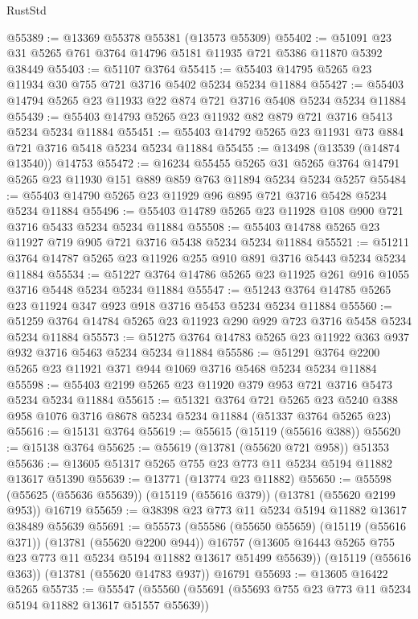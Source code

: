 \begin{lexlean}{RustStd}
\begin{coremodule}
@55389 := @13369 @55378 @55381 (@13573 @55309)
@55402 := @51091 @23 @31 @5265 @761 @3764 @14796 @5181 @11935 @721 @5386 @11870 @5392 @38449
@55403 := @51107 @3764
@55415 := @55403 @14795 @5265 @23 @11934 @30 @755 @721 @3716 @5402 @5234 @5234 @11884
@55427 := @55403 @14794 @5265 @23 @11933 @22 @874 @721 @3716 @5408 @5234 @5234 @11884
@55439 := @55403 @14793 @5265 @23 @11932 @82 @879 @721 @3716 @5413 @5234 @5234 @11884
@55451 := @55403 @14792 @5265 @23 @11931 @73 @884 @721 @3716 @5418 @5234 @5234 @11884
@55455 := @13498 (@13539 (@14874 @13540)) @14753
@55472 := @16234
    @55455
    @5265
    @31
    @5265
    @3764
    @14791
    @5265
    @23
    @11930
    @151
    @889
    @859
    @763
    @11894
    @5234
    @5234
    @5257
@55484 := @55403 @14790 @5265 @23 @11929 @96 @895 @721 @3716 @5428 @5234 @5234 @11884
@55496 := @55403 @14789 @5265 @23 @11928 @108 @900 @721 @3716 @5433 @5234 @5234 @11884
@55508 := @55403 @14788 @5265 @23 @11927 @719 @905 @721 @3716 @5438 @5234 @5234 @11884
@55521 := @51211 @3764 @14787 @5265 @23 @11926 @255 @910 @891 @3716 @5443 @5234 @5234 @11884
@55534 := @51227 @3764 @14786 @5265 @23 @11925 @261 @916 @1055 @3716 @5448 @5234 @5234 @11884
@55547 := @51243 @3764 @14785 @5265 @23 @11924 @347 @923 @918 @3716 @5453 @5234 @5234 @11884
@55560 := @51259 @3764 @14784 @5265 @23 @11923 @290 @929 @723 @3716 @5458 @5234 @5234 @11884
@55573 := @51275 @3764 @14783 @5265 @23 @11922 @363 @937 @932 @3716 @5463 @5234 @5234 @11884
@55586 := @51291 @3764 @2200 @5265 @23 @11921 @371 @944 @1069 @3716 @5468 @5234 @5234 @11884
@55598 := @55403 @2199 @5265 @23 @11920 @379 @953 @721 @3716 @5473 @5234 @5234 @11884
@55615 := @51321
    @3764
    @721
    @5265
    @23
    @5240
    @388
    @958
    @1076
    @3716
    @8678
    @5234
    @5234
    @11884
    (@51337 @3764 @5265 @23)
@55616 := @15131 @3764
@55619 := @55615 (@15119 (@55616 @388))
@55620 := @15138 @3764
@55625 := @55619 (@13781 (@55620 @721 @958)) @51353
@55636 := @13605 @51317 @5265 @755 @23 @773 @11 @5234 @5194 @11882 @13617 @51390
@55639 := @13771 (@13774 @23 @11882)
@55650 := @55598 (@55625 (@55636 @55639)) (@15119 (@55616 @379)) (@13781 (@55620 @2199 @953)) @16719
@55659 := @38398 @23 @773 @11 @5234 @5194 @11882 @13617 @38489 @55639
@55691 := @55573
    (@55586
      (@55650 @55659)
      (@15119 (@55616 @371))
      (@13781 (@55620 @2200 @944))
      @16757
      (@13605 @16443 @5265 @755 @23 @773 @11 @5234 @5194 @11882 @13617 @51499 @55639))
    (@15119 (@55616 @363))
    (@13781 (@55620 @14783 @937))
    @16791
@55693 := @13605 @16422 @5265
@55735 := @55547
    (@55560
      (@55691 (@55693 @755 @23 @773 @11 @5234 @5194 @11882 @13617 @51557 @55639))

\end{coremodule}
\end{lexlean}
